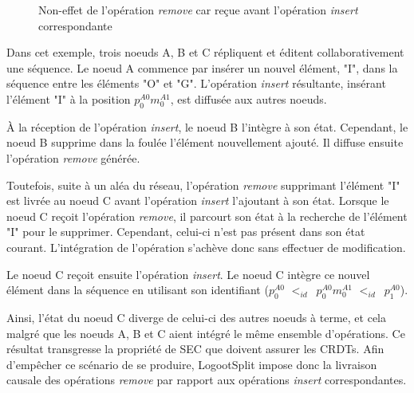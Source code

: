 \documentclass[12pt]{thesul}
\newcommand{\trm}[1]{\mathit{#1}}
\newcommand{\id}[3]{$\trm{#1}^{\trm{#2}}_{\trm{#3}}$}
\newcommand{\lid}{$<_{id}$~}
\begin{document}
\begin{figure}[!ht]
{
  }
  \caption{Non-effet de l'opération \emph{remove} car reçue avant l'opération \emph{insert} correspondante}
  \label{fig:why-causal-remove}
\end{figure}

Dans cet exemple, trois noeuds A, B et C répliquent et éditent collaborativement une séquence.
Le noeud A commence par insérer un nouvel élément, "I", dans la séquence entre les éléments "O" et "G".
L'opération \emph{insert} résultante, insérant l'élément "I" à la position \id{p}{A0}{0}\id{m}{A1}{0}, est diffusée aux autres noeuds.

À la réception de l'opération \emph{insert}, le noeud B l'intègre à son état.
Cependant, le noeud B supprime dans la foulée l'élément nouvellement ajouté.
Il diffuse ensuite l'opération \emph{remove} générée.

Toutefois, suite à un aléa du réseau, l'opération \emph{remove} supprimant l'élément "I" est livrée au noeud C avant l'opération \emph{insert} l'ajoutant à son état.
Lorsque le noeud C reçoit l'opération \emph{remove}, il parcourt son état à la recherche de l'élément "I" pour le supprimer.
Cependant, celui-ci n'est pas présent dans son état courant.
L'intégration de l'opération s'achève donc sans effectuer de modification.

Le noeud C reçoit ensuite l'opération \emph{insert}.
Le noeud C intègre ce nouvel élément dans la séquence en utilisant son identifiant (\id{p}{A0}{0} \lid \id{p}{A0}{0}\id{m}{A1}{0} \lid \id{p}{A0}{1}).

Ainsi, l'état du noeud C diverge de celui-ci des autres noeuds à terme, et cela malgré que les noeuds A, B et C aient intégré le même ensemble d'opérations.
Ce résultat transgresse la propriété de \ac{SEC} que doivent assurer les \acp{CRDT}.
Afin d'empêcher ce scénario de se produire, LogootSplit impose donc la livraison causale des opérations \emph{remove} par rapport aux opérations \emph{insert} correspondantes.
\end{document}
